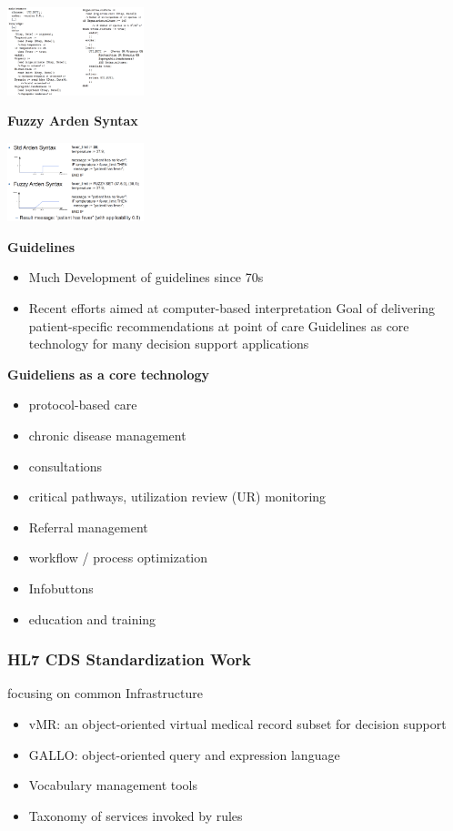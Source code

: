 \documentclass{report}
\newenvironment{Figure}
	{\par\medskip\noindent\minipage{\linewidth}}
	{\endminipage\par\medskip}
\theoremstyle{definition}
\theoremstyle{example}
\begin{document}
\begin{Figure}
   \centering
    \includegraphics[width=150px]{img/MLMExample.png}
        \label{fig:example MLM}
\end{Figure}

\textbf{Fuzzy Arden Syntax}
\begin{Figure}
   \centering
    \includegraphics[width=150px]{img/FuzzyArdenSyntax.png}
        \label{fig:The Fuzzy Arden Syntax}
\end{Figure}

\textbf{Guidelines}
\begin{itemize}
   \item Much Development of guidelines since 70s
   \item Recent efforts aimed at computer-based interpretation
   \subitem Goal of delivering patient-specific recommendations at point of care
   \subitem Guidelines as core technology for many decision support applications
\end{itemize}

\textbf{Guideliens as a core technology}
\begin{itemize}
   \item protocol-based care
   \item chronic disease management
   \item consultations
   \item critical pathways, utilization review (UR) monitoring
   \item Referral management
   \item workflow / process optimization
   \item Infobuttons
   \item education and training
\end{itemize}

\subsubsection{HL7 CDS Standardization Work}
focusing on common Infrastructure
\begin{itemize}
   \item vMR: an object-oriented virtual medical record subset for decision support
   \item GALLO: object-oriented query and expression language
   \item Vocabulary management tools
   \item Taxonomy of services invoked by rules
\end{itemize}
\end{document}
